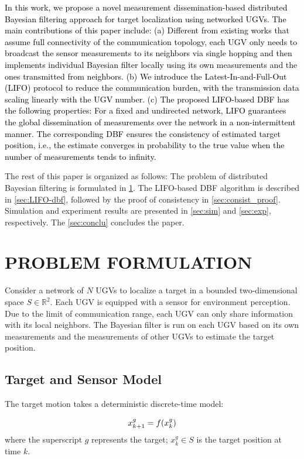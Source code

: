 \documentclass[journal]{IEEEtranTIE}
\theoremstyle{remark}
\newcommand{\xg}{x^g}
\begin{document}
	\textcolor{black}{In this work, we propose a novel measurement dissemination-based distributed Bayesian filtering approach for target localization using networked UGVs.
		The main contributions of this paper include:
		(a) Different from existing works that assume full connectivity of the communication topology, each UGV only needs to broadcast the sensor measurements to its neighbors via single hopping and then implements individual Bayesian filter locally using its own measurements and the ones transmitted from neighbors.
		(b) We introduce the Latest-In-and-Full-Out (LIFO) protocol to reduce the communication burden,
		with the transmission data scaling linearly with the UGV number.
		(c) The proposed LIFO-based DBF has the following properties: For a fixed and undirected network, LIFO guarantees the global dissemination of measurements over the network in a non-intermittent manner.
		The corresponding DBF ensures the consistency of estimated target position, i.e., the estimate converges in probability to the true value when the number of measurements tends to infinity.}
	
	The rest of this paper is organized as follows: 
	The problem of distributed Bayesian filtering is formulated in \cref{sec:prob_form}.
	The LIFO-based DBF algorithm is described in \cref{sec:LIFO-dbf}, followed by the proof of consistency in \cref{sec:consist_proof}.
	Simulation and experiment results are presented in \cref{sec:sim} and \cref{sec:exp}, respectively.
	The \cref{sec:conclu} concludes the paper.
	
	\section{PROBLEM FORMULATION}\label{sec:prob_form}
	Consider a network of $N$ UGVs to localize a target in a bounded two-dimensional space $S\in\mathbb{R}^{2}$. 
	Each UGV is equipped with a sensor for environment perception. 
	Due to the limit of communication range, each UGV can only share information 
	with its local neighbors.
	The Bayesian filter is run on each UGV based on its own measurements and the measurements of other UGVs to estimate the target position.
	
	\subsection{Target and Sensor Model}
	The target motion takes a deterministic discrete-time model: 
	
	\begin{equation}
		\small
		\label{eqn:tar_motion_model}
		\xg_{k+1}=f(\xg_k)
	\end{equation}\normalsize
	where the superscript $g$ represents the target; $\xg_k\in S$ is the target position at time $k$. %
	
\end{document}
